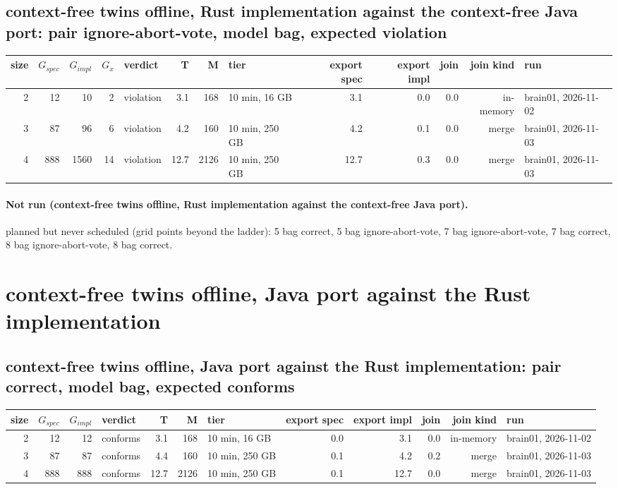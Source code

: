 \documentclass[10pt]{article}
\begin{document}
\subsection*{context-free twins offline, Rust implementation against the context-free Java port: pair \textsf{ignore-abort-vote}, model bag, expected violation}
\begin{longtable}{@{}rrrrlrrlrrrrl@{}}
\toprule
size & $G_{\mathit{spec}}$ & $G_{\mathit{impl}}$ & $G_x$ & verdict & T & M & tier & export spec & export impl & join & join kind & run \\
\midrule
\endhead
\color{red} 2 & 12 & 10 & 2 & violation & 3.1 & 168 & 10 min, 16 GB & 3.1 & 0.0 & 0.0 & in-memory & brain01, 2026-11-02 \\
\color{blue} 3 & 87 & 96 & 6 & violation & 4.2 & 160 & 10 min, 250 GB & 4.2 & 0.1 & 0.0 & merge & brain01, 2026-11-03 \\
\color{blue} 4 & 888 & 1560 & 14 & violation & 12.7 & 2126 & 10 min, 250 GB & 12.7 & 0.3 & 0.0 & merge & brain01, 2026-11-03 \\
\bottomrule
\end{longtable}
\paragraph{Not run (context-free twins offline, Rust implementation against the context-free Java port).}
planned but never scheduled (grid points beyond the ladder): 5 bag correct, 5 bag ignore-abort-vote, 7 bag ignore-abort-vote, 7 bag correct, 8 bag ignore-abort-vote, 8 bag correct.\par
\section*{context-free twins offline, Java port against the Rust implementation}
\subsection*{context-free twins offline, Java port against the Rust implementation: pair \textsf{correct}, model bag, expected conforms}
\begin{longtable}{@{}rrrlrrlrrrrl@{}}
\toprule
size & $G_{\mathit{spec}}$ & $G_{\mathit{impl}}$ & verdict & T & M & tier & export spec & export impl & join & join kind & run \\
\midrule
\endhead
\color{red} 2 & 12 & 12 & conforms & 3.1 & 168 & 10 min, 16 GB & 0.0 & 3.1 & 0.0 & in-memory & brain01, 2026-11-02 \\
\color{blue} 3 & 87 & 87 & conforms & 4.4 & 160 & 10 min, 250 GB & 0.1 & 4.2 & 0.2 & merge & brain01, 2026-11-03 \\
\color{blue} 4 & 888 & 888 & conforms & 12.7 & 2126 & 10 min, 250 GB & 0.1 & 12.7 & 0.0 & merge & brain01, 2026-11-03 \\
\bottomrule
\end{longtable}
\end{document}
